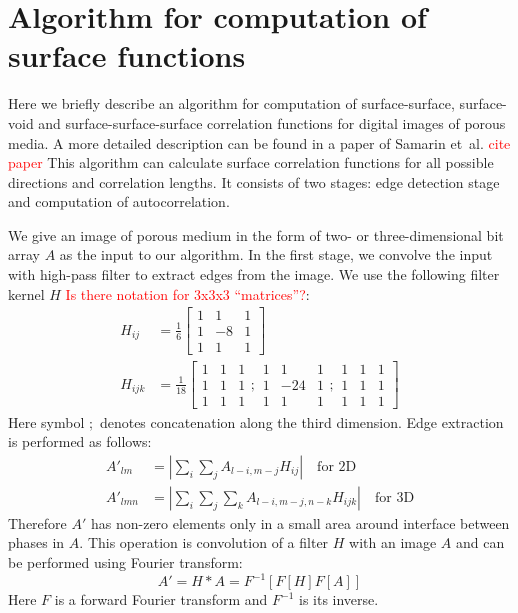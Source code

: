 \documentclass[reprint,amsmath,amssymb,aps,pre,showkeys,showpacs]{revtex4-1}
\begin{document}
\section{Algorithm for computation of surface functions}
\label{sec:algo}
Here we briefly describe an algorithm for computation of surface-surface,
surface-void and surface-surface-surface correlation functions for digital
images of porous media. A more detailed description can be found in a paper of
Samarin et~al. \textcolor{red}{cite paper} This algorithm can calculate surface
correlation functions for all possible directions and correlation lengths. It
consists of two stages: edge detection stage and computation of autocorrelation.

We give an image of porous medium in the form of two- or three-dimensional bit
array $A$ as the input to our algorithm. In the first stage, we convolve the
input with high-pass filter to extract edges from the image. We use the
following filter kernel $H$ \textcolor{red}{Is there notation for 3x3x3
  ``matrices''?}:
\begin{align}
  H_{ij} &= \frac{1}{6} \left[
    \begin{array}{ccc}
      1 & 1 & 1 \\
      1 & -8 & 1 \\
      1 & 1 & 1
    \end{array}
    \right] \label{eq:filter-3x3-2d} \\
  H_{ijk} &= \frac{1}{18} \left[
    \begin{array}{ccc}
      1 & 1 & 1 \\
      1 & 1 & 1 \\
      1 & 1 & 1
    \end{array} ;
    \begin{array}{ccc}
      1 & 1 & 1 \\
      1 & -24 & 1 \\
      1 & 1 & 1
    \end{array} ;
    \begin{array}{ccc}
      1 & 1 & 1 \\
      1 & 1 & 1 \\
      1 & 1 & 1
    \end{array}
    \right] \label{eq:filter-3x3-3d}
\end{align}
Here symbol $;$ denotes concatenation along the third dimension. Edge extraction
is performed as follows:
\begin{align*}
  A'_{lm}  &= \left| \sum_i\sum_j A_{l-i, m-j}H_{ij} \right| \quad \text{for 2D} \\
  A'_{lmn} &= \left| \sum_i\sum_j\sum_k A_{l-i, m-j, n-k}H_{ijk} \right| \quad
  \text{for 3D}
\end{align*}
Therefore $A'$ has non-zero elements only in a small area around interface
between phases in $A$. This operation is convolution of a filter $H$ with an
image $A$ and can be performed using Fourier transform:
\begin{equation*}
  A' = H*A = F^{-1}[F[H] F[A]]
\end{equation*}
Here $F$ is a forward Fourier transform and $F^{-1}$ is its inverse.
\end{document}
